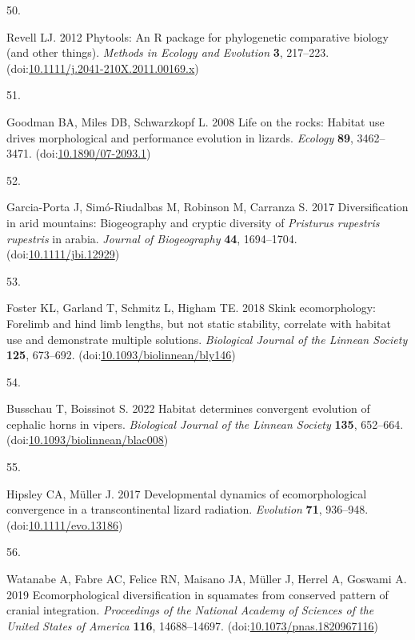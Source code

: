 \documentclass[
  11pt,
]{article}
\newlength{\cslhangindent}
\newlength{\csllabelwidth}
\newlength{\cslentryspacingunit} %
\newenvironment{CSLReferences}[2] %
 {%
  \setlength{\parindent}{0pt}
  \ifodd #1
  \let\oldpar\par
  \def\par{\hangindent=\cslhangindent\oldpar}
  \fi
  \setlength{\parskip}{#2\cslentryspacingunit}
 }%
 {}
\newcommand{\CSLLeftMargin}[1]{\parbox[t]{\csllabelwidth}{#1}}
\newcommand{\CSLRightInline}[1]{\parbox[t]{\linewidth - \csllabelwidth}{#1}\break}
\begin{document}
\begin{CSLReferences}{0}{0}
\leavevmode{}%
\CSLLeftMargin{50. }%
\CSLRightInline{Revell LJ. 2012 Phytools: An {R} package for
phylogenetic comparative biology (and other things). \emph{Methods in
Ecology and Evolution} \textbf{3}, 217--223.
(doi:\href{https://doi.org/10.1111/j.2041-210X.2011.00169.x}{10.1111/j.2041-210X.2011.00169.x})}

\leavevmode{}%
\CSLLeftMargin{51. }%
\CSLRightInline{Goodman BA, Miles DB, Schwarzkopf L. 2008 {Life on the
rocks: Habitat use drives morphological and performance evolution in
lizards}. \emph{Ecology} \textbf{89}, 3462--3471.
(doi:\href{https://doi.org/10.1890/07-2093.1}{10.1890/07-2093.1})}

\leavevmode{}%
\CSLLeftMargin{52. }%
\CSLRightInline{Garcia-Porta J, Simó-Riudalbas M, Robinson M, Carranza
S. 2017 Diversification in arid mountains: Biogeography and cryptic
diversity of \emph{{P}risturus rupestris rupestris} in arabia.
\emph{Journal of Biogeography} \textbf{44}, 1694--1704.
(doi:\href{https://doi.org/10.1111/jbi.12929}{10.1111/jbi.12929})}

\leavevmode{}%
\CSLLeftMargin{53. }%
\CSLRightInline{Foster KL, Garland T, Schmitz L, Higham TE. 2018 {Skink
ecomorphology: Forelimb and hind limb lengths, but not static stability,
correlate with habitat use and demonstrate multiple solutions}.
\emph{Biological Journal of the Linnean Society} \textbf{125}, 673--692.
(doi:\href{https://doi.org/10.1093/biolinnean/bly146}{10.1093/biolinnean/bly146})}

\leavevmode{}%
\CSLLeftMargin{54. }%
\CSLRightInline{Busschau T, Boissinot S. 2022 {Habitat determines
convergent evolution of cephalic horns in vipers}. \emph{Biological
Journal of the Linnean Society} \textbf{135}, 652--664.
(doi:\href{https://doi.org/10.1093/biolinnean/blac008}{10.1093/biolinnean/blac008})}

\leavevmode{}%
\CSLLeftMargin{55. }%
\CSLRightInline{Hipsley CA, Müller J. 2017 {Developmental dynamics of
ecomorphological convergence in a transcontinental lizard radiation}.
\emph{Evolution} \textbf{71}, 936--948.
(doi:\href{https://doi.org/10.1111/evo.13186}{10.1111/evo.13186})}

\leavevmode{}%
\CSLLeftMargin{56. }%
\CSLRightInline{Watanabe A, Fabre AC, Felice RN, Maisano JA, Müller J,
Herrel A, Goswami A. 2019 {Ecomorphological diversification in squamates
from conserved pattern of cranial integration}. \emph{Proceedings of the
National Academy of Sciences of the United States of America}
\textbf{116}, 14688--14697.
(doi:\href{https://doi.org/10.1073/pnas.1820967116}{10.1073/pnas.1820967116})}


\end{CSLReferences}
\end{document}
